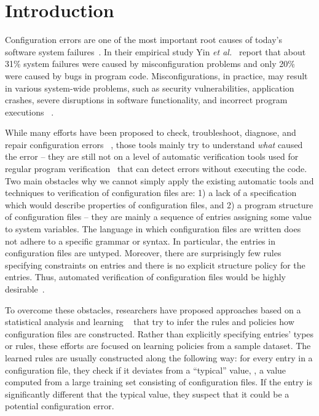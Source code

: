 \section{Introduction}
\label{sec-intro}

Configuration errors are one of the most important root causes of
today's software system failures~\cite{xu15systems, yin11anempirical}.
In their empirical study Yin {\em et al.}~\cite{yin11anempirical} report
that about 31\% system failures were caused by misconfiguration problems and only 20\% were caused by bugs in program code. 
Misconfigurations, in practice, may result in various
system-wide problems, such as security vulnerabilities, 
application crashes, severe disruptions in software
functionality, and incorrect program executions%
~\cite{zhang14encore, yuan11context, xu13do, xu15hey}.  

While many efforts have been proposed 
to check, troubleshoot, diagnose, and repair configuration errors%
~\cite{attariyan10automating,
su07autobash, whitaker04configuration},
those tools mainly try to understand {\emph{what}} caused the 
error -- they are still not on a level of
automatic verification tools used for regular program 
verification~\cite{Leino10Dafny, PiskacWZ14, BobotFMP15} that can
detect errors without executing the code.
Two main obstacles why we cannot simply apply the existing automatic 
tools and techniques to verification of configuration files are: 1) a lack
of a specification which would describe properties of configuration files, and 2) a program structure of configuration files -- they
are mainly a sequence of entries assigning some value to system variables. The language in which configuration files are written does 
not adhere to a specific grammar or syntax. In particular, the
entries in configuration files are untyped. Moreover, there are surprisingly few rules specifying constraints on entries and there
is no explicit structure policy for the entries.
Thus, automated verification of configuration 
files would be highly
desirable~\cite{wang04automatic, zhang14encore, xu15systems}.

To overcome these obstacles, researchers have proposed approaches based on
a statistical analysis and learning%
~\cite{wang04automatic, zhang14encore, yuan11context}
that try to infer the rules and policies 
how configuration files are constructed.
Rather than explicitly specifying entries' types or rules, 
these efforts are focused on learning policies from a sample dataset.
The learned rules are usually constructed along the following way: 
for every entry in a configuration file, 
they check if it deviates from a ``typical'' value, \ie, 
a value computed from a large training set 
consisting of configuration files.
If the entry is significantly different that the typical value, 
they suspect that it could be a potential configuration error.

